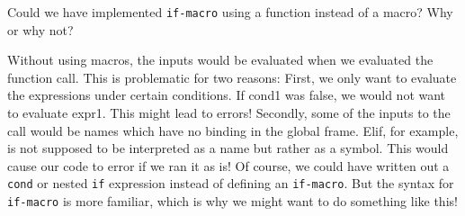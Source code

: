 \begin{blocksection}
\question Could we have implemented \texttt{if-macro} using a function instead of a macro? Why or why not?
\begin{solution}
Without using macros, the inputs would be evaluated when we evaluated the function call. This is problematic for two reasons:
\newline
First, we only want to evaluate the expressions under certain conditions. If cond1 was false, we would not want to evaluate expr1. This might lead to errors!
\newline
Secondly, some of the inputs to the call would be names which have no binding in the global frame. Elif, for example, is not supposed to be interpreted as a name
but rather as a symbol. This would cause our code to error if we ran it as is!
\newline
Of course, we could have written out a \texttt{cond} or nested \texttt{if} expression instead of defining an \texttt{if-macro}. But the syntax for \texttt{if-macro} 
is more familiar, which is why we might want to do something like this!
\end{solution}
\end{blocksection}